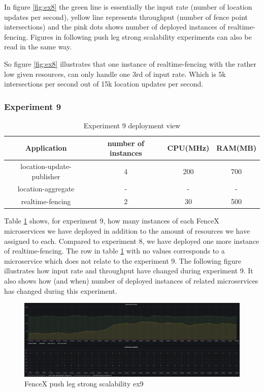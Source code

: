 \documentclass[a4]{report}
\begin{document}
    In figure \ref{fig:ex8} the green line is essentially the input rate (number of location updates per second),
    yellow line represents throughput (number of fence point intersections) and the pink dots shows number of
    deployed instances of realtime-fencing.
    Figures in following push leg strong scalability experiments can also be read in the same way.

    So figure \ref{fig:ex8} illustrates that one instance of realtime-fencing with the rather low given resources, can
    only handle one 3rd of input rate.
    Which is 5k intersections per second out of 15k location updates per second.

    \clearpage

    \subsubsection{Experiment 9}
    \begin{table}[h!]
        \centering
        \begin{tabular}{|c|c|c|c|}
            \hline
            Application               & number of instances & CPU(MHz) & RAM(MB) \\
            \hline
            location-update-publisher & 4                   & 200      & 700     \\
            location-aggregate        & -                   & -        & -       \\
            realtime-fencing          & 2                   & 30       & 500     \\
            \hline
        \end{tabular}
        \caption{Experiment 9 deployment view}
        \label{table:ex9-dv}
    \end{table}

    Table \ref{table:ex9-dv} shows, for experiment 9, how many instances of each FenceX microservices we have
    deployed in addition to the amount of resources we have assigned to each.
    Compared to experiment 8, we have deployed one more instance of realtime-fencing.
    The row in table \ref{table:ex9-dv} with no values corresponds to a microservice which does not relate to the
    experiment 9.
    The following figure illustrates how input rate and throughput have changed during experiment 9.
    It also shows how (and when) number of deployed instances of related microservices has changed during this
    experiment.

    \begin{figure}[h!]
        \centering
        \caption{FenceX push leg strong scalability ex9}
        \label{fig:ex9}
        \includegraphics[width=\linewidth, scale=2]{images/evaluation/ex9-benchmarking-ongoing-2per4sec.png}
    \end{figure}
\end{document}
